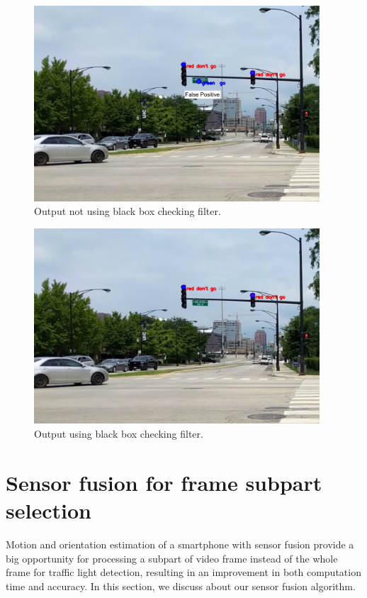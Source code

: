 \begin{figure}[!ht]
\centering
\includegraphics[width=4.2in]{images/norec_filter.pdf}
\caption{Output not using black box checking filter.}
\label{f:norec_filter}
\end{figure}



\begin{figure}[ht!]
\centering
\includegraphics[width=4.2in]{images/rec_filter.pdf}
\caption{Output using black box checking filter.}
\label{f:rec_filter}
\end{figure}




\section{Sensor fusion for frame subpart selection}
Motion and orientation estimation of a smartphone with sensor fusion provide a big opportunity for processing a subpart of video frame instead of the whole frame for traffic light detection, resulting in an improvement in both computation time and accuracy.
In this section, we discuss about our sensor fusion algorithm. 

